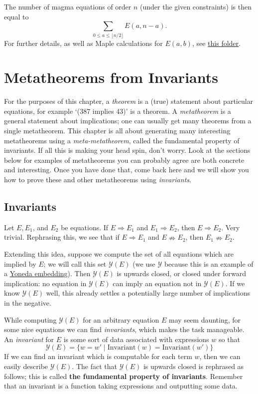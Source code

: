 The number of magma equations of order $n$ (under the given constraints) is then equal to
$$\sum_{0 \le a \le \lfloor n/2 \rfloor } E(a,n-a) .
$$
For further details, as well as Maple calculations for $E(a,b)$, see \href{https://github.com/teorth/equational_theories/tree/main/scripts/count_magma_eqns}{this folder}.


\chapter{Metatheorems from Invariants}\label{metatheory-chapter}

For the purposes of this chapter, a \emph{theorem} is a (true) statement about particular equations, for example `(387 implies 43)' is a theorem. A \emph{metatheorem} is a general statement about implications; one can usually get many theorems from a single metatheorem. This chapter is all about generating many interesting metatheorems using a \emph{meta-metatheorem}, called the fundamental property of invariants. If all this is making your head spin, don't worry. Look at the sections below for examples of metatheorems you can probably agree are both concrete and interesting. Once you have done that, come back here and we will show you how to prove these and other metatheorems using \emph{invariants}.

\section{Invariants}
Let $E, E_1$, and $E_2$ be equations. If $E \Rightarrow E_1$ and $E_1 \Rightarrow E_2$, then $E \Rightarrow E_2$. Very trivial. Rephrasing this, we see that if $E \Rightarrow E_1$ and $E \nRightarrow E_2$, then $E_1\nRightarrow E_2$.

Extending this idea, suppose we compute the set of all equations which are implied by $E$; we will call this set $\mathcal{Y}(E)$ (we use $\mathcal{Y}$ because this is an example of a \href{https://en.wikipedia.org/wiki/Yoneda_lemma#The_Yoneda_embedding}{Yoneda embedding}). Then $\mathcal{Y}(E)$ is upwards closed, or closed under forward implication: no equation in $\mathcal{Y}(E)$ can imply an equation not in $\mathcal{Y}(E)$. If we know $\mathcal{Y}(E)$ well, this already settles a potentially large number of implications in the negative.

While computing $\mathcal{Y}(E)$ for an arbitrary equation $E$ may seem daunting, for some nice equations we can find \emph{invariants}, which makes the task manageable. An \emph{invariant} for $E$ is some sort of data associated with expressions $w$ so that
\[
\mathcal{Y}(E) = \{w = w' \mid \text{Invariant}(w) = \text{Invariant}(w')\}
\]
If we can find an invariant which is computable for each term $w$, then we can easily describe $\mathcal{Y}(E)$. The fact that $\mathcal{Y}(E)$ is upwards closed is rephrased as follows; this is called \textbf{the fundamental property of invariants}. Remember that an invariant is a function taking expressions and outputting some data.


